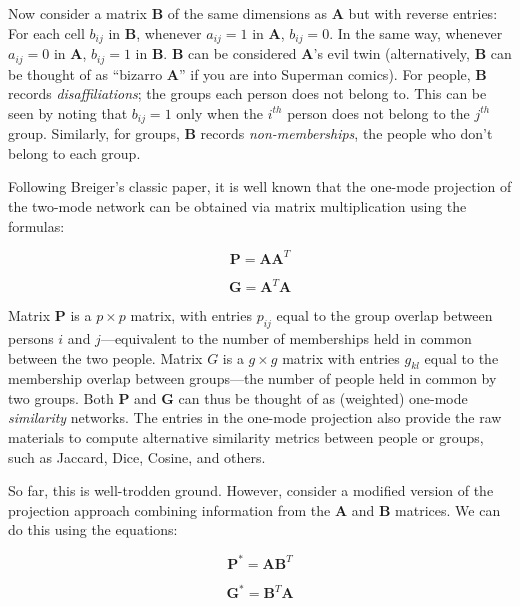 \documentclass[a4paper,fleqn]{cas-sc}
\begin{document}
Now consider a matrix $\mathbf{B}$ of the same dimensions as $\mathbf{A}$ but with reverse entries: For each cell $b_{ij}$ in $\mathbf{B}$, whenever $a_{ij} = 1$ in $\mathbf{A}$, $b_{ij} = 0$. In the same way, whenever $a_{ij} = 0$ in $\mathbf{A}$, $b_{ij} = 1$ in $\mathbf{B}$. $\mathbf{B}$ can be considered $\mathbf{A}$'s evil twin (alternatively, $\mathbf{B}$ can be thought of as ``bizarro $\mathbf{A}$'' if you are into Superman comics). For people, $\mathbf{B}$ records \textit{disaffiliations}; the groups each person does not belong to. This can be seen by noting that $b_{ij} = 1$ only when the $i^{th}$ person does not belong to the $j^{th}$ group. Similarly, for groups, $\mathbf{B}$ records \textit{non-memberships}, the people who don't belong to each group. 

Following Breiger's \citeyearpar{breiger1974duality} classic paper, it is well known that the one-mode projection of the two-mode network can be obtained via matrix multiplication using the formulas:

\begin{equation}
    \textbf{P} = \textbf{AA}^T
\end{equation}

\begin{equation}
    \textbf{G} = \textbf{A}^T\textbf{A}
\end{equation}

Matrix $\mathbf{P}$ is a $p \times p$ matrix, with entries $p_{ij}$ equal to the group overlap between persons $i$ and $j$---equivalent to the number of memberships held in common between the two people. Matrix $G$ is a $g \times g$ matrix with entries $g_{kl}$ equal to the membership overlap between groups---the number of people held in common by two groups. Both $\mathbf{P}$ and $\mathbf{G}$ can thus be thought of as (weighted) one-mode \textit{similarity} networks. The entries in the one-mode projection also provide the raw materials to compute alternative similarity metrics between people or groups, such as Jaccard, Dice, Cosine, and others. 

So far, this is well-trodden ground. However, consider a modified version of the projection approach combining information from the $\mathbf{A}$ and $\mathbf{B}$ matrices. We can do this using the equations:

\begin{equation}
    \textbf{P}^* = \textbf{AB}^T
\end{equation}

\begin{equation}
    \textbf{G}^* = \textbf{B}^T\textbf{A}
\end{equation}
\end{document}

